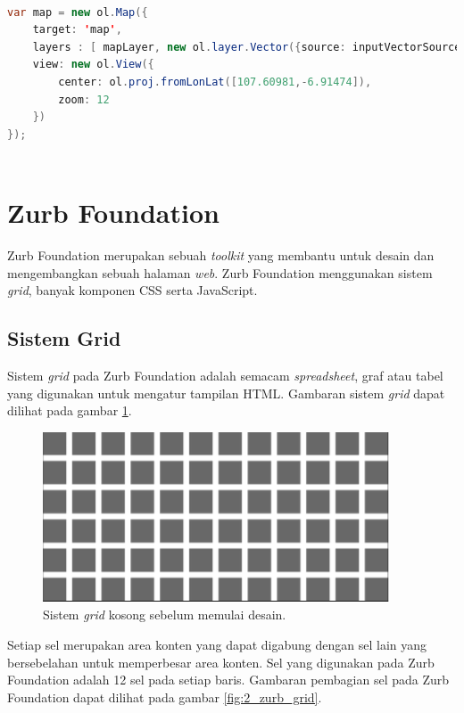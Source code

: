 \begin{lstlisting}[caption=Menambahkan vektor pada peta,label = {lst_2_ol_map},language=Java]
	
var map = new ol.Map({
    target: 'map',
    layers : [ mapLayer, new ol.layer.Vector({source: inputVectorSource}), new ol.layer.Vector({source: resultVectorSource}) ],
    view: new ol.View({
        center: ol.proj.fromLonLat([107.60981,-6.91474]),
        zoom: 12
    })
});
		
\end{lstlisting}

\section{Zurb Foundation}
\label{sec:zurbfoundation}

Zurb Foundation \cite{zurbfoundationbook} merupakan sebuah \textit{toolkit} yang membantu untuk desain dan mengembangkan sebuah halaman \textit{web}. Zurb Foundation menggunakan sistem \textit{grid}, banyak komponen CSS serta JavaScript. 

\subsection{Sistem Grid}
Sistem \textit{grid} pada Zurb Foundation adalah semacam \textit{spreadsheet}, graf atau tabel yang digunakan untuk mengatur tampilan HTML. Gambaran sistem \textit{grid} dapat dilihat pada gambar \ref{fig:2_zurb_grid_blank}.

\begin{figure}[H]
	\centering
	\includegraphics[scale=0.5]{Gambar/zurb-gridblank}
	\caption{Sistem \textit{grid} kosong sebelum memulai desain.} 
	\label{fig:2_zurb_grid_blank}
\end{figure}

Setiap sel merupakan area konten yang dapat digabung dengan sel lain yang bersebelahan untuk memperbesar area konten. Sel yang digunakan pada Zurb Foundation adalah 12 sel pada setiap baris. Gambaran pembagian sel pada Zurb Foundation dapat dilihat pada gambar \ref{fig:2_zurb_grid}.


